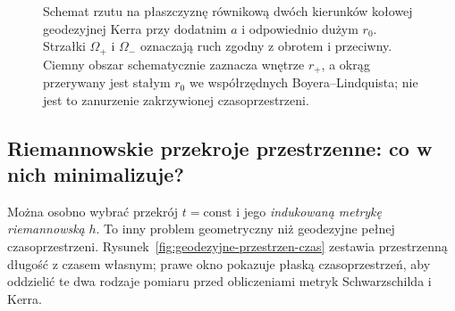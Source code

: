 \begin{figure}[htbp]
\centering
{}
\caption{Schemat rzutu na płaszczyznę równikową dwóch kierunków kołowej geodezyjnej Kerra przy dodatnim $a$ i odpowiednio dużym $r_0$. Strzałki $\Omega_+$ i $\Omega_-$ oznaczają ruch zgodny z obrotem i przeciwny. Ciemny obszar schematycznie zaznacza wnętrze $r_+$, a okrąg przerywany jest stałym $r_0$ we współrzędnych Boyera--Lindquista; nie jest to zanurzenie zakrzywionej czasoprzestrzeni.}
\label{fig:geodezyjna-kerr-kolowa}
\end{figure}

\subsection*{Riemannowskie przekroje przestrzenne: co w nich minimalizuje?}

Można osobno wybrać przekrój $t=\mathrm{const}$
i jego \emph{indukowaną metrykę riemannowską}
$h$. To inny problem geometryczny niż
geodezyjne pełnej czasoprzestrzeni.
Rysunek~\ref{fig:geodezyjne-przestrzen-czas} zestawia
przestrzenną długość z czasem własnym; prawe okno
pokazuje płaską czasoprzestrzeń, aby oddzielić te
dwa rodzaje pomiaru przed obliczeniami metryk
Schwarzschilda i Kerra.

